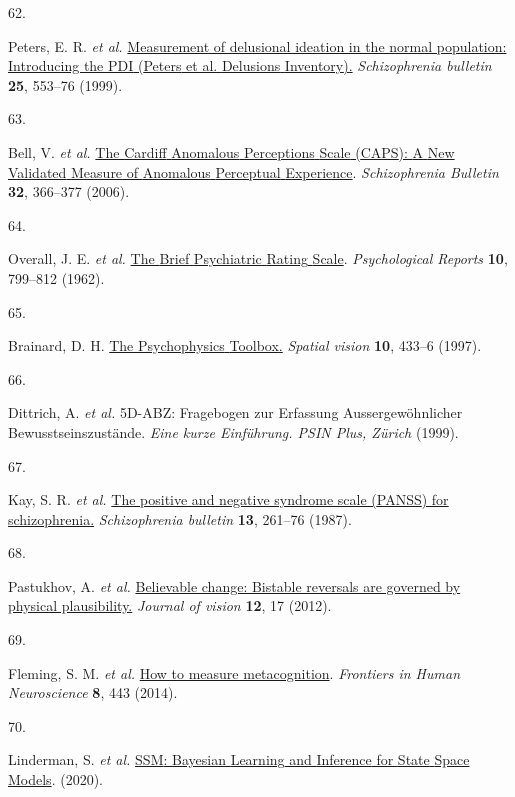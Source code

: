 \documentclass[
]{article}
\newlength{\cslhangindent}
\newlength{\csllabelwidth}
\newenvironment{CSLReferences}[2] %
 {\begin{list}{}{%
  \setlength{\itemindent}{0pt}
  \setlength{\leftmargin}{0pt}
  \setlength{\parsep}{0pt}
  \ifodd #1
   \setlength{\leftmargin}{\cslhangindent}
   \setlength{\itemindent}{-1\cslhangindent}
  \fi
  \setlength{\itemsep}{#2\baselineskip}}}
 {\end{list}}
\newcommand{\CSLLeftMargin}[1]{\parbox[t]{\csllabelwidth}{\strut#1\strut}}
\newcommand{\CSLRightInline}[1]{\parbox[t]{\linewidth - \csllabelwidth}{\strut#1\strut}}
\begin{document}
\begin{CSLReferences}{0}{0}
\CSLLeftMargin{62. }%
\CSLRightInline{Peters, E. R. \emph{et al.}
\href{https://www.ncbi.nlm.nih.gov/pubmed/10478789}{Measurement of
delusional ideation in the normal population: Introducing the {PDI}
({Peters} et al. {Delusions} {Inventory}).} \emph{Schizophrenia
bulletin} \textbf{25}, 553--76 (1999).}

\CSLLeftMargin{63. }%
\CSLRightInline{Bell, V. \emph{et al.}
\href{https://doi.org/10.1093/schbul/sbj014}{The {Cardiff} {Anomalous}
{Perceptions} {Scale} ({CAPS}): {A} {New} {Validated} {Measure} of
{Anomalous} {Perceptual} {Experience}}. \emph{Schizophrenia Bulletin}
\textbf{32}, 366--377 (2006).}

\CSLLeftMargin{64. }%
\CSLRightInline{Overall, J. E. \emph{et al.}
\href{https://doi.org/10.2466/pr0.1962.10.3.799}{The {Brief}
{Psychiatric} {Rating} {Scale}}. \emph{Psychological Reports}
\textbf{10}, 799--812 (1962).}

\CSLLeftMargin{65. }%
\CSLRightInline{Brainard, D. H.
\href{https://www.ncbi.nlm.nih.gov/pubmed/9176952}{The {Psychophysics}
{Toolbox}.} \emph{Spatial vision} \textbf{10}, 433--6 (1997).}

\CSLLeftMargin{66. }%
\CSLRightInline{Dittrich, A. \emph{et al.} {5D}-{ABZ}: {Fragebogen} zur
{Erfassung} {Aussergewöhnlicher} {Bewusstseinszustände}. \emph{Eine
kurze Einführung. PSIN Plus, Zürich} (1999).}

\CSLLeftMargin{67. }%
\CSLRightInline{Kay, S. R. \emph{et al.}
\href{https://www.ncbi.nlm.nih.gov/pubmed/3616518}{The positive and
negative syndrome scale ({PANSS}) for schizophrenia.}
\emph{Schizophrenia bulletin} \textbf{13}, 261--76 (1987).}

\CSLLeftMargin{68. }%
\CSLRightInline{Pastukhov, A. \emph{et al.}
\href{https://doi.org/10.1167/12.1.17}{Believable change: Bistable
reversals are governed by physical plausibility.} \emph{Journal of
vision} \textbf{12}, 17 (2012).}

\CSLLeftMargin{69. }%
\CSLRightInline{Fleming, S. M. \emph{et al.}
\href{https://doi.org/10.3389/fnhum.2014.00443}{How to measure
metacognition}. \emph{Frontiers in Human Neuroscience} \textbf{8}, 443
(2014).}

\CSLLeftMargin{70. }%
\CSLRightInline{Linderman, S. \emph{et al.}
\href{https://github.com/lindermanlab/ssm}{{SSM}: {Bayesian} {Learning}
and {Inference} for {State} {Space} {Models}}. (2020).}


\end{CSLReferences}
\end{document}
